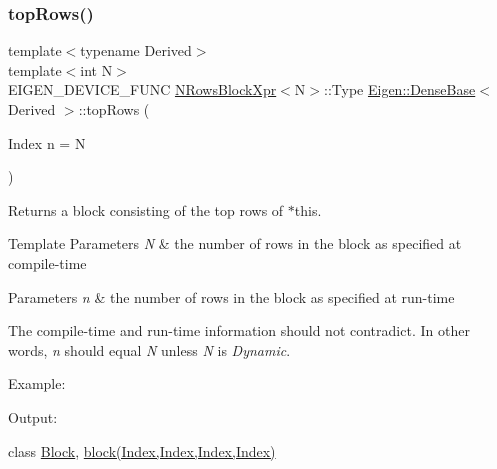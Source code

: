 \subsubsection{\texorpdfstring{topRows()}{topRows()}\hspace{0.1cm}{\footnotesize\ttfamily [2/2]}}
{\footnotesize\ttfamily template$<$typename Derived$>$ \\
template$<$int N$>$ \\
E\+I\+G\+E\+N\+\_\+\+D\+E\+V\+I\+C\+E\+\_\+\+F\+U\+NC \mbox{\hyperlink{struct_eigen_1_1_dense_base_1_1_n_rows_block_xpr}{N\+Rows\+Block\+Xpr}}$<$N$>$\+::Type \mbox{\hyperlink{class_eigen_1_1_dense_base}{Eigen\+::\+Dense\+Base}}$<$ Derived $>$\+::top\+Rows (\begin{DoxyParamCaption}\item[{Index}]{n = {\ttfamily N} }\end{DoxyParamCaption})\hspace{0.3cm}{\ttfamily [inline]}}

\begin{DoxyReturn}{Returns}
a block consisting of the top rows of $\ast$this.
\end{DoxyReturn}

\begin{DoxyTemplParams}{Template Parameters}
{\em N} & the number of rows in the block as specified at compile-\/time \\
\hline
\end{DoxyTemplParams}

\begin{DoxyParams}{Parameters}
{\em n} & the number of rows in the block as specified at run-\/time\\
\hline
\end{DoxyParams}
The compile-\/time and run-\/time information should not contradict. In other words, {\itshape n} should equal {\itshape N} unless {\itshape N} is {\itshape Dynamic}.

Example\+: 
\begin{DoxyCodeInclude}{0}
\end{DoxyCodeInclude}
 Output\+: 
\begin{DoxyVerbInclude}
\end{DoxyVerbInclude}
 class \mbox{\hyperlink{class_eigen_1_1_block}{Block}}, \mbox{\hyperlink{class_eigen_1_1_dense_base_ab8e42e67c5cfd5fa13e684642f0f65bf}{block(\+Index,\+Index,\+Index,\+Index)}} \mbox{\label{class_eigen_1_1_dense_base_ac8952c19644a4ac7e41bea45c19b909c}} 

